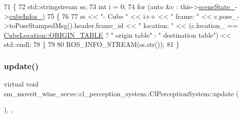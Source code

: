 \begin{DoxyCode}
71             \{
72                 std::stringstream ss;
73                 \textcolor{keywordtype}{int} i = 0;
74                 \textcolor{keywordflow}{for} (\textcolor{keyword}{auto} &c : this->\hyperlink{classsm__moveit__wine__serve_1_1cl__perception__system_1_1ClPerceptionSystem_addfd893a6f290ffc73d7f55cce9e637b}{sceneState\_}->\hyperlink{classsm__moveit__wine__serve_1_1cl__perception__system_1_1CpSceneState_a0b2d760a8ff2cb5e3735879d67ea3e67}{cubeInfos\_})
75                 \{
76 
77                     ss << \textcolor{stringliteral}{"- Cube "} << i++ << \textcolor{stringliteral}{" frame: "} << c.pose\_->toPoseStampedMsg().header.frame\_id << \textcolor{stringliteral}{
      " location: "} << (c.location\_ == \hyperlink{namespacesm__moveit__wine__serve_1_1cl__perception__system_abb5953d380907809caaf4c1a83eec32cae5ee34c3ef8ec4a46a00a218416c7b1d}{CubeLocation::ORIGIN\_TABLE} ? \textcolor{stringliteral}{" origin table"} : \textcolor{stringliteral}{"
       destination table"}) << std::endl;
78                 \}
79 
80                 ROS\_INFO\_STREAM(ss.str());
81             \}
\end{DoxyCode}
\mbox{\label{classsm__moveit__wine__serve_1_1cl__perception__system_1_1ClPerceptionSystem_ac0bee71483d666f6179f243724c3b4a5}} 
\subsubsection{\texorpdfstring{update()}{update()}}
{\footnotesize\ttfamily virtual void sm\+\_\+moveit\+\_\+wine\+\_\+serve\+::cl\+\_\+perception\+\_\+system\+::\+Cl\+Perception\+System\+::update (\begin{DoxyParamCaption}{ }\end{DoxyParamCaption})\hspace{0.3cm}{\ttfamily [inline]}, {\ttfamily [override]}, {\ttfamily [virtual]}}



